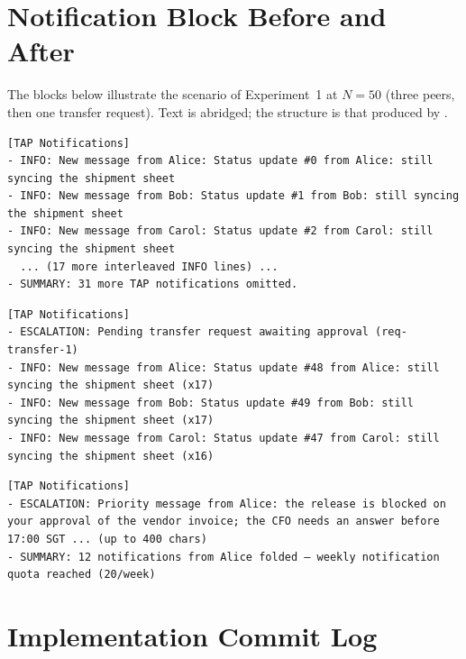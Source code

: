 \section{Notification Block Before and After}
\label{app:block}

The blocks below illustrate the scenario of Experiment~1 at $N=50$ (three peers, then one
transfer request). Text is abridged; the structure is that produced by
.

\begin{lstlisting}[caption={Legacy pipeline: per-event FIFO, hard 20-line cap. The escalation is inside the omitted tail.}]
[TAP Notifications]
- INFO: New message from Alice: Status update #0 from Alice: still syncing the shipment sheet
- INFO: New message from Bob: Status update #1 from Bob: still syncing the shipment sheet
- INFO: New message from Carol: Status update #2 from Carol: still syncing the shipment sheet
  ... (17 more interleaved INFO lines) ...
- SUMMARY: 31 more TAP notifications omitted.
\end{lstlisting}

\begin{lstlisting}[caption={New pipeline: coalesced queue, escalation-first plan. The escalation is line one; each peer is one counted line.}]
[TAP Notifications]
- ESCALATION: Pending transfer request awaiting approval (req-transfer-1)
- INFO: New message from Alice: Status update #48 from Alice: still syncing the shipment sheet (x17)
- INFO: New message from Bob: Status update #49 from Bob: still syncing the shipment sheet (x17)
- INFO: New message from Carol: Status update #47 from Carol: still syncing the shipment sheet (x16)
\end{lstlisting}

\begin{lstlisting}[caption={Quota folding and a paid priority message, as rendered for an over-quota grant holder.}]
[TAP Notifications]
- ESCALATION: Priority message from Alice: the release is blocked on your approval of the vendor invoice; the CFO needs an answer before 17:00 SGT ... (up to 400 chars)
- SUMMARY: 12 notifications from Alice folded — weekly notification quota reached (20/week)
\end{lstlisting}

\section{Implementation Commit Log}
\label{app:commits}

